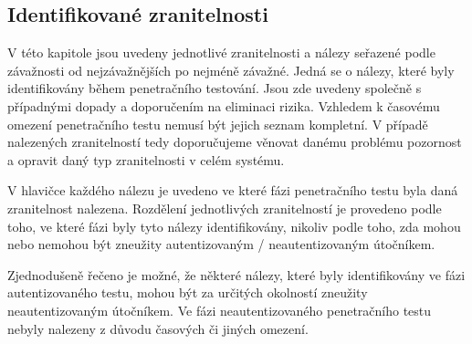 \newpage
\subsection{Identifikované zranitelnosti}

V této kapitole jsou uvedeny jednotlivé zranitelnosti a nálezy seřazené podle závažnosti od nejzávažnějších po nejméně závažné.
Jedná se o nálezy, které byly identifikovány během penetračního testování. Jsou zde uvedeny společně s případnými dopady a doporučením na eliminaci rizika.
Vzhledem k časovému omezení penetračního testu nemusí být jejich seznam kompletní. V případě nalezených zranitelností tedy
doporučujeme věnovat danému problému pozornost a opravit daný typ zranitelnosti v celém systému.

V hlavičce každého nálezu je uvedeno ve které fázi penetračního testu byla daná zranitelnost nalezena. Rozdělení jednotlivých zranitelností je provedeno
podle toho, ve které fázi byly tyto nálezy identifikovány, nikoliv podle toho, zda mohou nebo nemohou být zneužity autentizovaným / neautentizovaným útočníkem.

Zjednodušeně řečeno je možné, že některé nálezy, které byly identifikovány ve fázi autentizovaného testu, mohou být za určitých
okolností zneužity neautentizovaným útočníkem. Ve fázi neautentizovaného penetračního testu nebyly nalezeny z důvodu časových či jiných omezení.


